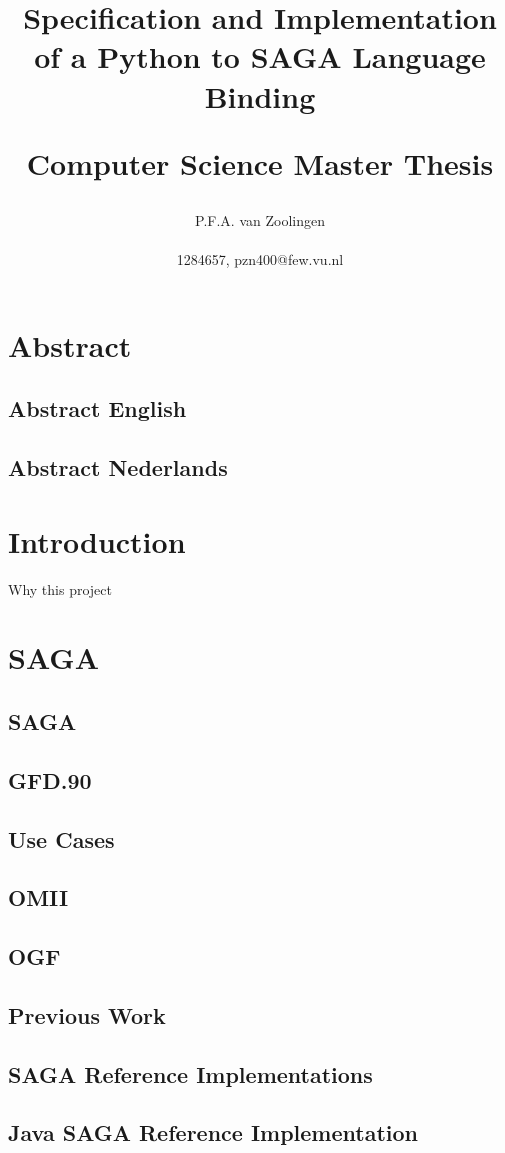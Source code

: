 \documentclass[a4paper,11pt,onecolumn,notitlepage]{article}
\author{
	P.F.A. van Zoolingen \\ 
	\begin{normalsize}
	1284657, pzn400@few.vu.nl
	\end{normalsize}
}
\title{
	\begin{center}
	Specification and Implementation of a Python to SAGA Language Binding \\
	\begin{normalsize}
	Computer Science Master Thesis
	\end{normalsize}
	\end{center}
}
\begin{document}
\maketitle
\section{Abstract}
\subsection{Abstract English}
\subsection{Abstract Nederlands}
\section{Introduction}
Why this project



\section{SAGA}
\subsection{SAGA}
\subsection{GFD.90}
\subsection{Use Cases}
\subsection{OMII}
\subsection{OGF}
\subsection{Previous Work}
\subsection{SAGA Reference Implementations}
\subsection{Java SAGA Reference Implementation}
\end{document}
